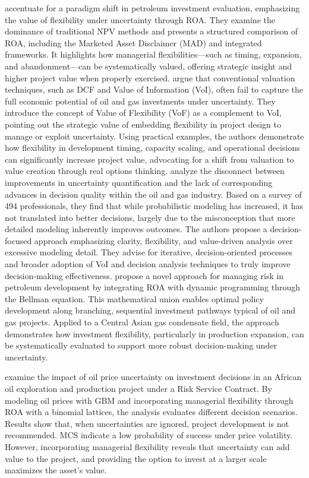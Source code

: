 \documentclass[pdflatex,sn-basic]{sn-jnl}%
\theoremstyle{thmstyleone}%
\theoremstyle{thmstyletwo}%
\theoremstyle{thmstylethree}%
\begin{document}
\cite{ref8} accentuate for a paradigm shift in petroleum investment evaluation, emphasizing the value of flexibility under uncertainty through ROA. They examine the dominance of traditional NPV methods and presents a structured comparison of ROA, including the Marketed Asset Disclaimer (MAD) and integrated frameworks. It highlights how managerial flexibilities—such as timing, expansion, and abandonment—can be systematically valued, offering strategic insight and higher project value when properly exercised. \cite{ref9} argue that conventional valuation techniques, such as DCF and Value of Information (VoI), often fail to capture the full economic potential of oil and gas investments under uncertainty. They introduce the concept of Value of Flexibility (VoF) as a complement to VoI, pointing out the strategic value of embedding flexibility in project design to manage or exploit uncertainty. Using practical examples, the authors demonstrate how flexibility in development timing, capacity scaling, and operational decisions can significantly increase project value, advocating for a shift from valuation to value creation through real options thinking. \cite{ref10} analyze the disconnect between improvements in uncertainty quantification and the lack of corresponding advances in decision quality within the oil and gas industry. Based on a survey of 494 professionals, they find that while probabilistic modeling has increased, it has not translated into better decisions, largely due to the misconception that more detailed modeling inherently improves outcomes. The authors propose a decision-focused approach emphasizing clarity, flexibility, and value-driven analysis over excessive modeling detail. They advise for iterative, decision-oriented processes and broader adoption of VoI and decision analysis techniques to truly improve decision-making effectiveness. \cite{ref11} propose a novel approach for managing risk in petroleum development by integrating ROA with dynamic programming through the Bellman equation. This mathematical union enables optimal policy development along branching, sequential investment pathways typical of oil and gas projects. Applied to a Central Asian gas condensate field, the approach demonstrates how investment flexibility, particularly in production expansion, can be systematically evaluated to support more robust decision-making under uncertainty.

\cite{ref11a} examine the impact of oil price uncertainty on investment decisions in an African oil exploration and production project under a Risk Service Contract. By modeling oil prices with GBM and incorporating managerial flexibility through ROA with a binomial lattices, the analysis evaluates different decision scenarios. Results show that, when uncertainties are ignored, project development is not recommended. MCS indicate a low probability of success under price volatility. However, incorporating managerial flexibility reveals that uncertainty can add value to the project, and providing the option to invest at a larger scale maximizes the asset’s value.
\end{document}
